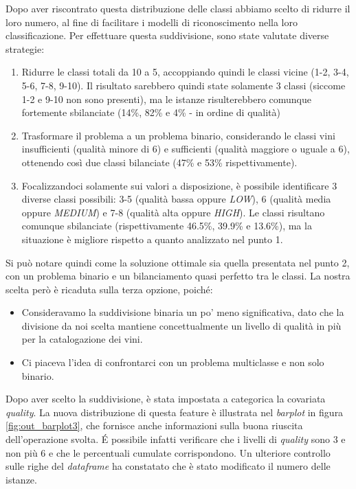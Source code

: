     Dopo aver riscontrato questa distribuzione delle classi abbiamo scelto di ridurre il loro numero, al fine di facilitare i modelli di riconoscimento nella loro classificazione. Per effettuare questa suddivisione, sono state valutate diverse strategie:
    \begin{enumerate}
        \item Ridurre le classi totali da 10 a 5, accoppiando quindi le classi vicine (1-2, 3-4, 5-6, 7-8, 9-10). Il risultato sarebbero quindi state solamente 3 classi (siccome 1-2 e 9-10 non sono presenti), ma le istanze risulterebbero comunque fortemente sbilanciate (14\%, 82\% e 4\% - in ordine di qualità)
        
        \item Trasformare il problema a un problema binario, considerando le classi vini insufficienti (qualità minore di 6) e sufficienti (qualità maggiore o uguale a 6), ottenendo così due classi bilanciate (47\% e 53\% rispettivamente).
        
        \item Focalizzandoci solamente sui valori a disposizione, è possibile identificare 3 diverse classi possibili: 3-5 (qualità bassa oppure \textit{LOW}), 6 (qualità media oppure \textit{MEDIUM}) e 7-8 (qualità alta oppure \textit{HIGH}). Le classi risultano comunque sbilanciate (rispettivamente 46.5\%, 39.9\% e 13.6\%), ma la situazione è migliore rispetto a quanto analizzato nel punto 1. 
    \end{enumerate}
    Si può notare quindi come la soluzione ottimale sia quella presentata nel punto 2, con un problema binario e un bilanciamento quasi perfetto tra le classi. La nostra scelta però è ricaduta sulla terza opzione, poiché:
    \begin{itemize}
        \item Consideravamo la suddivisione binaria un po' meno significativa, dato che la divisione da noi scelta mantiene concettualmente un livello di qualità in più per la catalogazione dei vini.
        \item Ci piaceva l'idea di confrontarci con un problema multiclasse e non solo binario. 
    \end{itemize}
    
    Dopo aver scelto la suddivisione, è stata impostata a categorica la covariata \textit{quality}. La nuova distribuzione di questa feature è illustrata nel \textit{barplot} in figura \ref{fig:out_barplot3}, che fornisce anche informazioni sulla buona riuscita dell'operazione svolta. \'E possibile infatti verificare che i livelli di \textit{quality} sono 3 e non più 6 e che le percentuali cumulate corrispondono. Un ulteriore controllo sulle righe del \textit{dataframe} ha constatato che è stato modificato il numero delle istanze.
    
